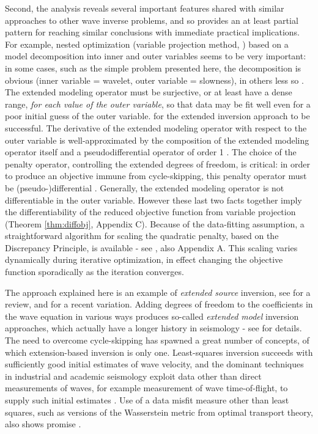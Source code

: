 Second, the analysis reveals several important features shared with
similar approaches to other wave inverse problems, and so provides an
at least partial pattern for reaching similar conclusions with
immediate practical implications. For example, nested optimization
(variable projection method, \cite{GolubPereyra:03}) based on a model
decomposition into inner and outer variables seems to be very
important: in some cases, such as the simple problem presented here,
the decomposition is obvious (inner variable = wavelet, outer variable
= slowness), in others less so
\cite[]{geoprosp:2008,Terentyev:thesis}. The extended modeling
operator must be surjective, or at least have a dense range, {\em for
  each value of the outer variable}, so that data may be fit well even
for a poor initial guess of the outer variable. for the extended
inversion approach to be successful. The derivative of the extended
modeling operator with respect to the outer variable is
well-approximated by the composition of the extended modeling operator
itself and a pseudodifferential operator of order 1
\cite[]{Symes:IPTA14,tenKroode:IPTA14}. The choice of the penalty
operator, controlling the extended degrees of freedom, is critical: in
order to produce an objective immune from cycle-skipping, this penalty
operator must be (pseudo-)differential
\cite[]{StolkSymes:03}. Generally, the extended modeling operator is
not differentiable in the outer variable. However these last two facts
together imply the differentiability of the reduced objective function
from variable projection (Theorem \ref{thm:diffobj}, Appendix C). Because of the data-fitting
assumption, a straightforward algorithm for scaling the quadratic
penalty, based on the Discrepancy Principle, is available - see
\cite{FuSymes2017discrepancy,SymesChenMinkoff:21}, also Appendix
A. This scaling varies dynamically during iterative optimization, in
effect changing the objective function sporadically as the iteration
converges.

The approach explained here is an example of {\em extended source}
inversion, see \cite{HuangNammourSymesDollizal:SEG19} for a review,
and \cite{MetivierBrossier:SEG20} for a recent variation. Adding
degrees of freedom to the coefficients in the wave equation in various
ways produces so-called {\em extended model} inversion approaches,
which actually have a longer history in seismology - see
\cite{geoprosp:2008} for details. The need to overcome cycle-skipping
has spawned a great number of concepts, of which extension-based
inversion is only one. Least-squares inversion succeeds with
sufficiently good initial estimates of wave velocity, and the dominant
techniques in industrial and academic seismology exploit data other
than direct measurements of waves, for example measurement of wave
time-of-flight, to supply such initial estimates
\cite[]{VirieuxOperto:09,Fichtner:10,Schuster:17}. Use of a data
misfit measure other than least squares, such as versions of the
Wasserstein metric from optimal transport theory, also shows promise
\cite[]{Metivier:GEO18,EngquistYang:GEO18}.

